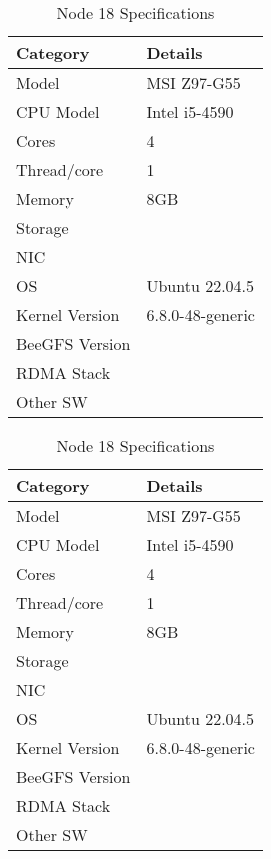 \begin{table}[htbp]
    \centering
    \begin{minipage}[b]{0.49\textwidth}
        \centering
        \caption{Node 17 Specifications}
        \label{tab:node1_specs}
        \begin{tabular}{lp{2.5cm}}
            \toprule
            \textbf{Category} & \textbf{Details} \\
            \midrule
            Model & MSI Z97-G55 \\
            CPU Model & Intel i5-4590 \\
            Cores & 4 \\
            Thread/core & 1 \\
            Memory & 8GB \\
            Storage &  \\
            NIC  &  \\
            OS & Ubuntu 22.04.5 \\
            Kernel Version & 6.8.0-48-generic \\
            BeeGFS Version &  \\
            RDMA Stack &  \\
            Other SW &  \\
            \bottomrule
        \end{tabular}
    \end{minipage}
    \hfill
    \begin{minipage}[b]{0.49\textwidth}
        \centering
        \caption{Node 18 Specifications}
        \label{tab:node2_specs}
        \begin{tabular}{lp{2.5cm}}
            \toprule
            \textbf{Category} & \textbf{Details} \\
            \midrule
            Model & MSI Z97-G55 \\
            CPU Model & Intel i5-4590 \\
            Cores & 4 \\
            Thread/core & 1 \\
            Memory & 8GB \\
            Storage &  \\
            NIC &  \\
            OS & Ubuntu 22.04.5 \\
            Kernel Version & 6.8.0-48-generic \\
            BeeGFS Version &  \\
            RDMA Stack &  \\
            Other SW &  \\
            \bottomrule
        \end{tabular}
    \end{minipage}
\end{table}
